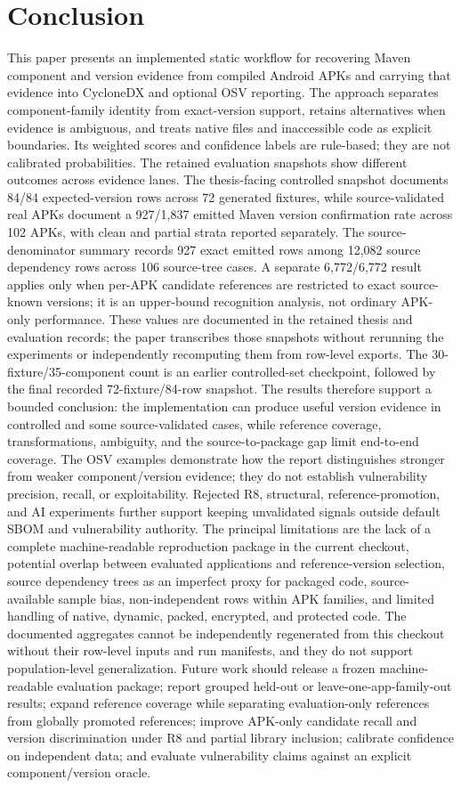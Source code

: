 \documentclass[10pt,twocolumn]{article}
\begin{document}
\section{Conclusion}
This paper presents an implemented static workflow for recovering Maven component and version evidence from compiled Android APKs and carrying that evidence into CycloneDX and optional OSV reporting. The approach separates component-family identity from exact-version support, retains alternatives when evidence is ambiguous, and treats native files and inaccessible code as explicit boundaries. Its weighted scores and confidence labels are rule-based; they are not calibrated probabilities.
The retained evaluation snapshots show different outcomes across evidence lanes. The thesis-facing controlled snapshot documents 84/84 expected-version rows across 72 generated fixtures, while source-validated real APKs document a 927/1,837 emitted Maven version confirmation rate across 102 APKs, with clean and partial strata reported separately. The source-denominator summary records 927 exact emitted rows among 12,082 source dependency rows across 106 source-tree cases. A separate 6,772/6,772 result applies only when per-APK candidate references are restricted to exact source-known versions; it is an upper-bound recognition analysis, not ordinary APK-only performance. These values are documented in the retained thesis and evaluation records; the paper transcribes those snapshots without rerunning the experiments or independently recomputing them from row-level exports. The 30-fixture/35-component count is an earlier controlled-set checkpoint, followed by the final recorded 72-fixture/84-row snapshot.
The results therefore support a bounded conclusion: the implementation can produce useful version evidence in controlled and some source-validated cases, while reference coverage, transformations, ambiguity, and the source-to-package gap limit end-to-end coverage. The OSV examples demonstrate how the report distinguishes stronger from weaker component/version evidence; they do not establish vulnerability precision, recall, or exploitability. Rejected R8, structural, reference-promotion, and AI experiments further support keeping unvalidated signals outside default SBOM and vulnerability authority.
The principal limitations are the lack of a complete machine-readable reproduction package in the current checkout, potential overlap between evaluated applications and reference-version selection, source dependency trees as an imperfect proxy for packaged code, source-available sample bias, non-independent rows within APK families, and limited handling of native, dynamic, packed, encrypted, and protected code. The documented aggregates cannot be independently regenerated from this checkout without their row-level inputs and run manifests, and they do not support population-level generalization.
Future work should release a frozen machine-readable evaluation package; report grouped held-out or leave-one-app-family-out results; expand reference coverage while separating evaluation-only references from globally promoted references; improve APK-only candidate recall and version discrimination under R8 and partial library inclusion; calibrate confidence on independent data; and evaluate vulnerability claims against an explicit component/version oracle.
\end{document}

